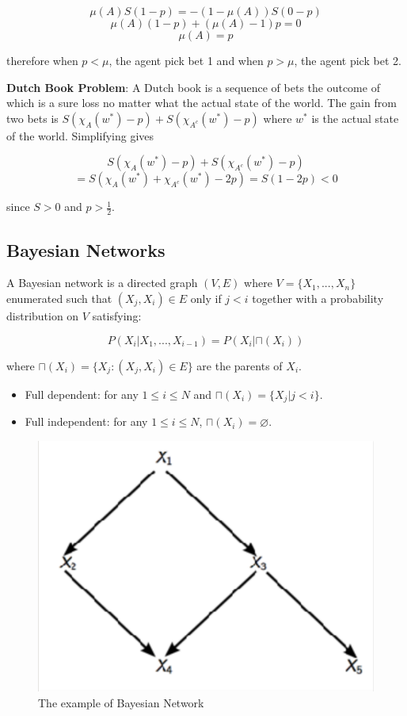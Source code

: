 \documentclass{article}
\begin{document}
$$\mu(A)S(1-p) = -(1-\mu(A))S(0-p)$$
$$\mu(A)(1-p) + (\mu(A)-1)p = 0$$
$$\mu(A) = p$$

therefore when $p < \mu$, the agent pick bet 1 and when $p > \mu$, the agent pick bet 2.


\textbf{Dutch Book Problem}: A Dutch book is a sequence of bets the outcome of which is a sure loss no matter what the actual state of the world. The gain from two bets is $S(\chi_A(w^{\ast}) - p) + S(\chi_{A^c}(w^{\ast}) - p)$ where $w^{\ast}$ is the actual state of the world. Simplifying gives

$$S(\chi_A(w^{\ast}) - p) + S(\chi_{A^c}(w^{\ast}) - p)$$
$$= S(\chi_A(w^{\ast}) + \chi_{A^c}(w^{\ast}) - 2p) = S(1 - 2p) < 0 $$

since $S > 0$ and $p > \frac{1}{2}$.


\subsection{Bayesian Networks}

A Bayesian network is a directed graph $(V, E)$ where $V = \{ X_1, ..., X_n \}$ enumerated such that $(X_j, X_i) \in E$ only if $j < i$ together with a probability distribution on $V$ satisfying:

\begin{equation}
    P(X_i | X_1, ..., X_{i-1}) = P(X_i | \sqcap(X_i))
\end{equation}

where $\sqcap(X_i) = \{ X_j : (X_j, X_i) \in E \}$ are the parents of $X_i$.

\begin{itemize}
    \item Full dependent: for any $1 \leq i \leq N$ and $\sqcap(X_i) = \{X_j | j < i \}$.
    \item Full independent: for any $1 \leq i \leq N$, $\sqcap(X_i) = \varnothing$.
\end{itemize}

\begin{figure}[h]
    \centering
    \includegraphics[scale=0.3]{images/bayesian-network-example.png}
    \caption{The example of Bayesian Network}
    \label{fig:my_label}
\end{figure}
\end{document}
